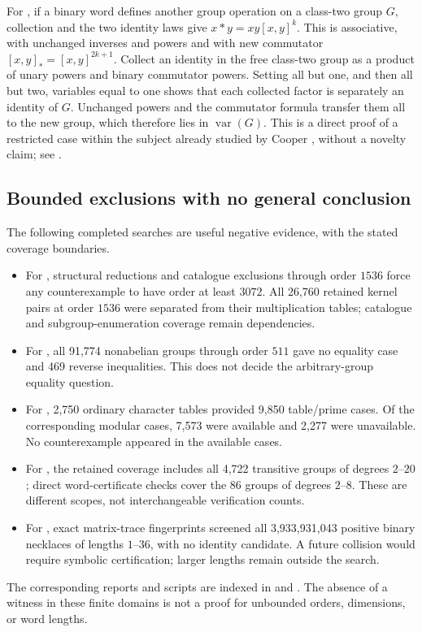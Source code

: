 For , if a binary word defines another group operation
on a class-two group \(G\), collection and the two identity laws
give \(x*y=xy[x,y]^k\). This is associative, with unchanged
inverses and powers and with new commutator
\([x,y]_*=[x,y]^{2k+1}\).
Collect an identity in the free class-two group as a product
of unary powers and binary commutator powers. Setting all but
one, and then all but two, variables equal to one shows that
each collected factor is separately an identity of \(G\).
Unchanged powers and the commutator formula transfer them all
to the new group, which therefore lies in \(\operatorname{var}(G)\).
This is a direct proof of a restricted case within the subject
already studied by Cooper \cite{cooper}, without a novelty claim;
see .

\subsection{Bounded exclusions with no general conclusion}

The following completed searches are useful negative evidence,
with the stated coverage boundaries.

\begin{itemize}
\item For , structural reductions and catalogue
exclusions through order \(1536\) force any counterexample
to have order at least \(3072\). All 26,760 retained kernel
pairs at order \(1536\) were separated from their multiplication
tables; catalogue and subgroup-enumeration coverage remain
dependencies.
\item For , all 91,774 nonabelian groups through
order \(511\) gave no equality case and 469 reverse inequalities.
This does not decide the arbitrary-group equality question.
\item For , 2,750 ordinary character tables provided
9,850 table/prime cases. Of the corresponding modular cases,
7,573 were available and 2,277 were unavailable. No
counterexample appeared in the available cases.
\item For , the retained coverage includes all
4,722 transitive groups of degrees \(2\)--\(20\); direct
word-certificate checks cover the 86 groups of degrees
\(2\)--\(8\). These are different scopes, not interchangeable
verification counts.
\item For , exact matrix-trace fingerprints screened
all 3,933,931,043 positive binary necklaces of lengths
\(1\)--\(36\), with no identity candidate.
A future collision would require symbolic certification;
larger lengths remain outside the search.
\end{itemize}

The corresponding reports and scripts are indexed in
 and .
The absence of a witness in these finite domains is not a
proof for unbounded orders, dimensions, or word lengths.
